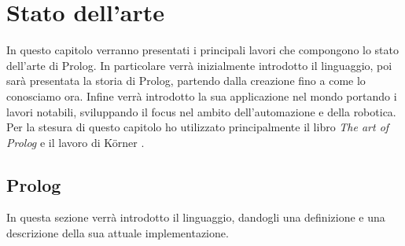 \chapter{Stato dell'arte}
\label{cha:statoarte}
In questo capitolo verranno presentati i principali lavori che compongono lo stato
dell'arte di Prolog. In particolare verrà inizialmente introdotto il linguaggio, poi sarà presentata la storia di Prolog, partendo dalla creazione
fino a come lo conosciamo ora. Infine verrà introdotto la sua applicazione nel mondo portando i lavori notabili, sviluppando il focus nel ambito dell'automazione e della robotica.
Per la stesura di questo capitolo ho utilizzato principalmente il libro \textit{The art of Prolog} \cite{krause_1995} e il lavoro di K\"orner \cite{korner2022fifty}.
\section{Prolog}
\label{sec:prolog}

In questa sezione verrà introdotto il linguaggio, dandogli una definizione e una descrizione della sua attuale implementazione.

